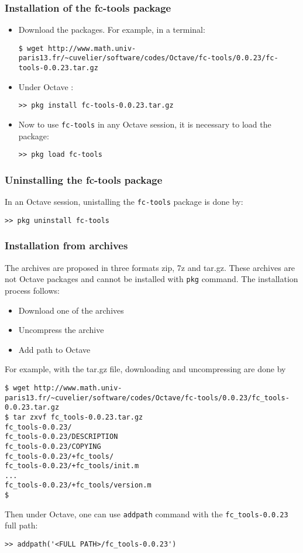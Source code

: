 \subsubsection{Installation of the fc-tools package}

\begin{itemize}
\item Download the packages. For example, in a terminal:
\begin{verbatim}
$ wget http://www.math.univ-paris13.fr/~cuvelier/software/codes/Octave/fc-tools/0.0.23/fc-tools-0.0.23.tar.gz
\end{verbatim}
\item Under Octave :
\begin{verbatim}
>> pkg install fc-tools-0.0.23.tar.gz
\end{verbatim}
\item Now to use \texttt{fc-tools} in any Octave session, it is necessary to load the package:
\begin{verbatim}
>> pkg load fc-tools
\end{verbatim}
\end{itemize}

\subsubsection{Uninstalling the fc-tools package}
In an Octave session, unistalling the \texttt{fc-tools} package is done by:
\begin{verbatim}
>> pkg uninstall fc-tools
\end{verbatim}

\subsubsection{Installation from archives}
The archives are proposed in three formats zip, 7z and tar.gz. These archives are not Octave packages and cannot be installed with \texttt{pkg} command.
The installation process follows:
\begin{itemize}
\item Download one of the archives
\item Uncompress the archive
\item Add path to Octave
\end{itemize}

For example, with the tar.gz file, downloading and uncompressing are done by 
\begin{verbatim}
$ wget http://www.math.univ-paris13.fr/~cuvelier/software/codes/Octave/fc-tools/0.0.23/fc_tools-0.0.23.tar.gz
$ tar zxvf fc_tools-0.0.23.tar.gz
fc_tools-0.0.23/
fc_tools-0.0.23/DESCRIPTION
fc_tools-0.0.23/COPYING
fc_tools-0.0.23/+fc_tools/
fc_tools-0.0.23/+fc_tools/init.m
...
fc_tools-0.0.23/+fc_tools/version.m
$
\end{verbatim}
Then under Octave, one can use \texttt{addpath} command with the \texttt{fc_tools-0.0.23} full path:
\begin{verbatim}
>> addpath('<FULL PATH>/fc_tools-0.0.23')
\end{verbatim}
 
